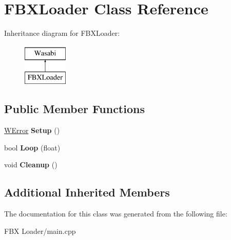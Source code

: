 \hypertarget{class_f_b_x_loader}{}\section{F\+B\+X\+Loader Class Reference}
\label{class_f_b_x_loader}
Inheritance diagram for F\+B\+X\+Loader\+:\begin{figure}[H]
\begin{center}
\leavevmode
\includegraphics[height=2.000000cm]{class_f_b_x_loader}
\end{center}
\end{figure}
\subsection*{Public Member Functions}
\begin{DoxyCompactItemize}
\item 
\hyperlink{class_w_error}{W\+Error} {\bfseries Setup} ()\hypertarget{class_f_b_x_loader_a4117c240e7bceb797ccca872bf346209}{}\label{class_f_b_x_loader_a4117c240e7bceb797ccca872bf346209}

\item 
bool {\bfseries Loop} (float)\hypertarget{class_f_b_x_loader_aa37b501ee44026c0741700d877dc6a85}{}\label{class_f_b_x_loader_aa37b501ee44026c0741700d877dc6a85}

\item 
void {\bfseries Cleanup} ()\hypertarget{class_f_b_x_loader_a86ba323666c7dc2b4f62290fc45bf41a}{}\label{class_f_b_x_loader_a86ba323666c7dc2b4f62290fc45bf41a}

\end{DoxyCompactItemize}
\subsection*{Additional Inherited Members}


The documentation for this class was generated from the following file\+:\begin{DoxyCompactItemize}
\item 
F\+B\+X Loader/main.\+cpp\end{DoxyCompactItemize}
